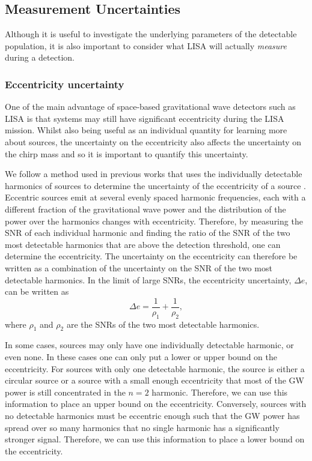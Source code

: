 \subsection{Measurement Uncertainties}\label{sec:measurement_uncertainties}
Although it is useful to investigate the underlying parameters of the detectable population, it is also important to consider what LISA will actually \textit{measure} during a detection.

\subsubsection{Eccentricity uncertainty}\label{sec:ecc_unc}
One of the main advantage of space-based gravitational wave detectors such as LISA is that systems may still have significant eccentricity during the LISA mission. Whilst also being useful as an individual quantity for learning more about sources, the uncertainty on the eccentricity also affects the uncertainty on the chirp mass and so it is important to quantify this uncertainty.

We follow a method used in previous works that uses the individually detectable harmonics of sources to determine the uncertainty of the eccentricity of a source \citep[e.g.][]{Lau+2020, Korol+2021}. Eccentric sources emit at several evenly spaced harmonic frequencies, each with a different fraction of the gravitational wave power and the distribution of the power over the harmonics changes with eccentricity. Therefore, by measuring the SNR of each individual harmonic and finding the ratio of the SNR of the two most detectable harmonics that are above the detection threshold, one can determine the eccentricity. The uncertainty on the eccentricity can therefore be written as a combination of the uncertainty on the SNR of the two most detectable harmonics. In the limit of large SNRs, the eccentricity uncertainty, $\Delta e$, can be written as 
\begin{equation}
    \Delta e = \frac{1}{\rho_1} + \frac{1}{\rho_2},
\end{equation}
where $\rho_1$ and $\rho_2$ are the SNRs of the two most detectable harmonics.

In some cases, sources may only have one individually detectable harmonic, or even none. In these cases one can only put a lower or upper bound on the eccentricity. For sources with only one detectable harmonic, the source is either a circular source or a source with a small enough eccentricity that most of the GW power is still concentrated in the $n = 2$ harmonic. Therefore, we can use this information to place an upper bound on the eccentricity. Conversely, sources with no detectable harmonics must be eccentric enough such that the GW power has spread over so many harmonics that no single harmonic has a significantly stronger signal. Therefore, we can use this information to place a lower bound on the eccentricity.

